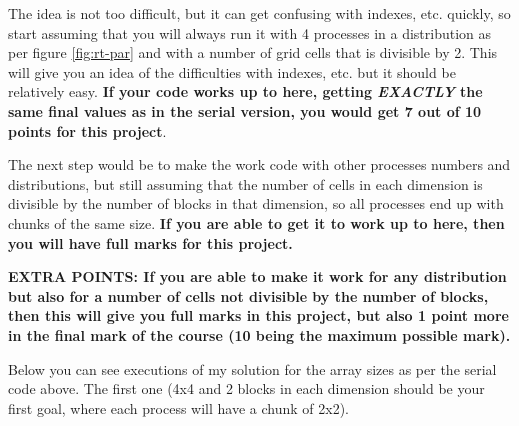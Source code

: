 The idea is not too difficult, but it can get confusing with indexes,
etc. quickly, so start assuming that you will always run it with 4 processes in
a distribution as per figure \ref{fig:rt-par} and with a number of grid cells
that is divisible by 2. This will give you an idea of the difficulties with
indexes, etc. but it should be relatively easy. \textbf{If your code works up to
  here, getting \textit{EXACTLY} the same final values as in the serial version,
  you would get 7 out of 10 points for this project}.

The next step would be to make the work code with other processes numbers and
distributions, but still assuming that the number of cells in each dimension is
divisible by the number of blocks in that dimension, so all processes end up
with chunks of the same size. \textbf{If you are able to get it to work up to here,
then you will have full marks for this project.}

\textbf{EXTRA POINTS: If you are able to make it work for any distribution but
  also for a number of cells not divisible by the number of blocks, then this
  will give you full marks in this project, but also 1 point more in the final
  mark of the course (10 being the maximum possible mark).}

Below you can see executions of my solution for the array sizes as per the
serial code above. The first one (4x4 and 2 blocks in each dimension should be
your first goal, where each process will have a chunk of 2x2).

